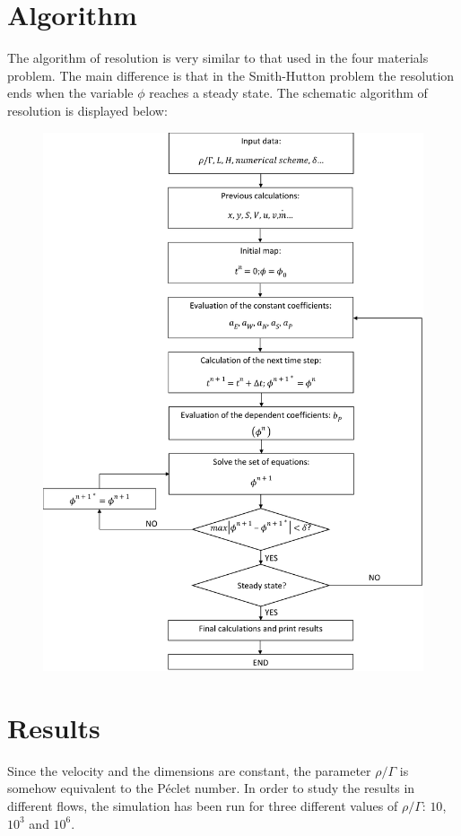 \section{Algorithm}
The algorithm of resolution is very similar to that used in the four materials problem. The main difference is that in the Smith-Hutton problem the resolution ends when the variable $\phi$ reaches a steady state. The schematic algorithm of resolution is displayed below:
\begin{figure}[h!]
	\includegraphics[scale=0.17]{SmithHutton/algorithm}
\end{figure}

\section{Results}
Since the velocity and the dimensions are constant, the parameter $\rho/\Gamma$ is somehow equivalent to the Péclet number. In order to study the results in different flows, the simulation has been run for three different values of $\rho/\Gamma$: $10$, $10^{3}$ and $10^{6}$.

